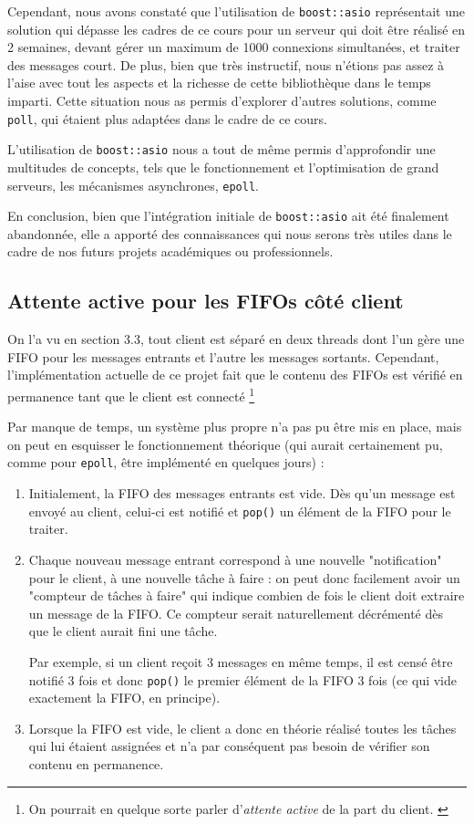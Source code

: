 \documentclass{article}
\begin{document}
Cependant, nous avons constaté que l’utilisation de \texttt{boost::asio} représentait une solution qui dépasse les cadres de ce cours pour un serveur qui doit être réalisé en 2 semaines, devant gérer un maximum de 1000 connexions simultanées, et traiter des messages court. De plus, bien que très instructif, nous n’étions pas assez à l’aise avec tout les aspects et la richesse de cette bibliothèque dans le temps imparti. Cette situation nous as permis d'explorer d’autres solutions, comme \texttt{poll}, qui étaient plus adaptées dans le cadre de ce cours.

L’utilisation de \texttt{boost::asio} nous a tout de même permis d'approfondir une multitudes de concepts, tels que le fonctionnement et l'optimisation de grand serveurs, les mécanismes asynchrones, \texttt{epoll}.

En conclusion, bien que l’intégration initiale de \texttt{boost::asio} ait été finalement abandonnée, elle a apporté des connaissances qui nous serons très utiles dans le cadre de nos futurs projets académiques ou professionnels.

\subsection{Attente active pour les FIFOs côté client}
\noindent On l'a vu en section 3.3, tout client est séparé en deux threads dont l'un gère une FIFO pour les messages entrants et l'autre les messages sortants. Cependant, l'implémentation actuelle de ce projet fait que le contenu des FIFOs est vérifié en permanence tant que le client est connecté \footnote{On pourrait en quelque sorte parler d'\textit{attente active} de la part du client. \cite{Attente Active} }

\noindent Par manque de temps, un système plus propre n'a pas pu être mis en place, mais on peut en esquisser le fonctionnement théorique (qui aurait certainement pu, comme pour \texttt{epoll}, être implémenté en quelques jours) :
\begin{enumerate}
    \item Initialement, la FIFO des messages entrants est vide. Dès qu'un message est envoyé au client, celui-ci est notifié et \texttt{pop()} un élément de la FIFO pour le traiter.
    \item Chaque nouveau message entrant correspond à une nouvelle "notification" pour le client, à une nouvelle tâche à faire : on peut donc facilement avoir un "compteur de tâches à faire" qui indique combien de fois le client doit extraire un message de la FIFO. Ce compteur serait naturellement décrémenté dès que le client aurait fini une tâche.

    Par exemple, si un client reçoit 3 messages en même temps, il est censé être notifié 3 fois et donc \texttt{pop()} le premier élément de la FIFO 3 fois (ce qui vide exactement la FIFO, en principe).
    \item Lorsque la FIFO est vide, le client a donc en théorie réalisé toutes les tâches qui lui étaient assignées et n'a par conséquent pas besoin de vérifier son contenu en permanence.
\end{enumerate}
\end{document}
